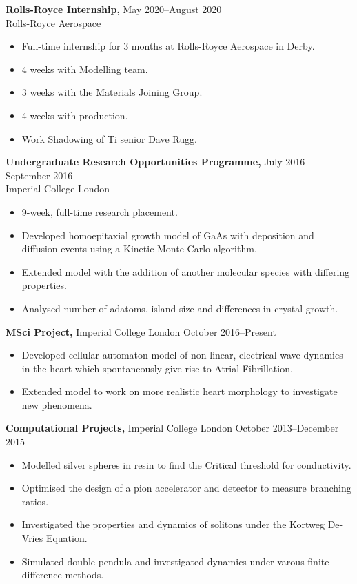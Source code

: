 \documentclass[margin]{res}
\begin{document}
\begin{resume}
  
 {\bf Rolls-Royce Internship,} \hfill May 2020--August 2020\\ Rolls-Royce Aerospace
  \begin{itemize} \itemsep -2pt  %
    \item Full-time internship for 3 months at Rolls-Royce Aerospace in Derby. 
    \item 4 weeks with Modelling team.
    \item 3 weeks with the Materials Joining Group.
    \item 4 weeks with production.
    \item Work Shadowing of Ti senior Dave Rugg.
  \end{itemize}

  
 {\bf Undergraduate Research Opportunities Programme,} \hfill July 2016--September 2016\\ Imperial College London
 \begin{itemize} \itemsep -2pt  %
   \item 9-week, full-time research placement.
   \item Developed homoepitaxial growth model of GaAs with deposition and diffusion events using a Kinetic Monte Carlo algorithm.
   \item Extended model with the addition of another molecular species with differing properties. 
   \item Analysed number of adatoms, island size and differences in crystal growth.
 \end{itemize}


 {\bf MSci Project,} Imperial College London \hfill October 2016--Present
 \begin{itemize} \itemsep -2pt  %
   \item Developed cellular automaton model of non-linear, electrical wave dynamics in the heart which spontaneously give rise to Atrial Fibrillation.
   \item Extended model to work on more realistic heart morphology to investigate new phenomena. 
 \end{itemize}



 {\bf Computational Projects,} Imperial College London \hfill October 2013--December 2015
 \begin{itemize} \itemsep -2pt  %
\item Modelled silver spheres in resin to find the Critical threshold for conductivity.
\item Optimised the design of a pion accelerator and detector to measure branching ratios.
 \item Investigated the properties and dynamics of solitons under the Kortweg De-Vries Equation.
\item Simulated double pendula and investigated dynamics under varous finite difference methods.




\end{itemize}
\end{resume}
\end{document}
